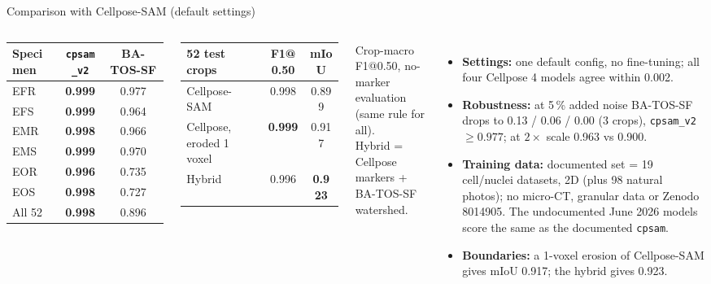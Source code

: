 \documentclass[aspectratio=169]{beamer}
\newcommand{\SF}{BA-TOS-SF}
\begin{document}
\begin{frame}{Comparison with Cellpose-SAM (default settings)}
\begin{columns}[T,onlytextwidth]
\centering
\footnotesize
\begin{tabular}{lcc}
\toprule
Specimen & \texttt{cpsam\_v2} & \SF{} \\
\midrule
EFR & \textbf{0.999} & 0.977 \\
EFS & \textbf{0.999} & 0.964 \\
EMR & \textbf{0.998} & 0.966 \\
EMS & \textbf{0.999} & 0.970 \\
EOR & \textbf{0.996} & 0.735 \\
EOS & \textbf{0.998} & 0.727 \\
\midrule
All 52 & \textbf{0.998} & 0.896 \\
\bottomrule
\end{tabular}

\vspace{0.15cm}
\begin{tabular}{lcc}
\toprule
52 test crops & F1@0.50 & mIoU \\
\midrule
Cellpose-SAM & 0.998 & 0.899 \\
Cellpose, eroded 1 voxel & \textbf{0.999} & 0.917 \\
Hybrid & 0.996 & \textbf{0.923} \\
\bottomrule
\end{tabular}

{\tiny Crop-macro F1@0.50, no-marker evaluation (same rule for all).\\ Hybrid = Cellpose markers + \SF{} watershed.}
\small
\begin{itemize}
  \item \textbf{Settings:} one default config, no fine-tuning; all four Cellpose 4 models agree within 0.002.
  \item \textbf{Robustness:} at 5\,\% added noise \SF{} drops to 0.13 / 0.06 / 0.00 (3 crops), \texttt{cpsam\_v2} $\ge 0.977$; at $2\times$ scale 0.963 vs 0.900.
  \item \textbf{Training data:} documented set = 19 cell/nuclei datasets, 2D (plus 98 natural photos); no micro-CT, granular data or Zenodo 8014905. The undocumented June 2026 models score the same as the documented \texttt{cpsam}.
  \item \textbf{Boundaries:} a 1-voxel erosion of Cellpose-SAM gives mIoU 0.917; the hybrid gives 0.923.
\end{itemize}
\end{columns}
\end{frame}
\end{document}
